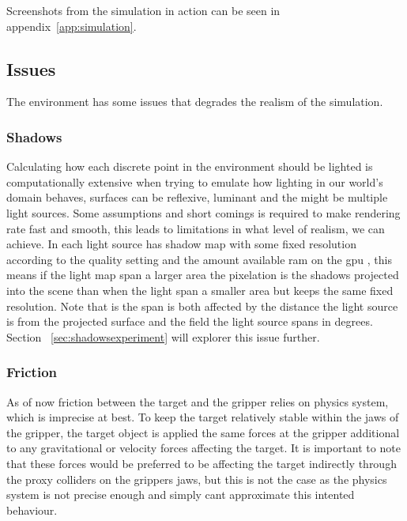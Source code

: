 Screenshots from the simulation in action can be seen in appendix~\ref{app:simulation}.



%

\subsection{Issues}

The environment has some issues that degrades the realism of the simulation. 

\subsubsection{Shadows}

Calculating how each discrete point in the environment should be lighted is computationally extensive when trying to emulate how lighting in our world's domain behaves, surfaces can be reflexive, luminant and the might be multiple light sources. Some assumptions and short comings is required to make rendering rate fast and smooth, this leads to limitations in what level of realism, we can achieve. In \cite{unity3d} each light source has shadow map with some fixed resolution according to the quality setting and the amount available ram on the gpu \cite{unityshadowmapsize}, this means if the light map span a larger area the pixelation is the shadows projected into the scene than when the light span a smaller area but keeps the same fixed resolution. Note that is the span is both affected by the distance the light source is from the projected surface and the field the light source spans in degrees. Section ~\ref{sec:shadowsexperiment} will explorer this issue further.

\subsubsection{Friction}

As of now friction between the target and the gripper relies on \cite{unityphysics} physics system, which is imprecise at best. To keep the target relatively stable within the jaws of the gripper, the target object is applied the same forces at the gripper additional to any gravitational or velocity forces affecting the target. It is important to note that these forces would be preferred to be affecting the target indirectly through the proxy colliders on the grippers jaws, but this is not the case as the \cite{unity3d} physics system is not precise enough and simply cant approximate this intented behaviour.

